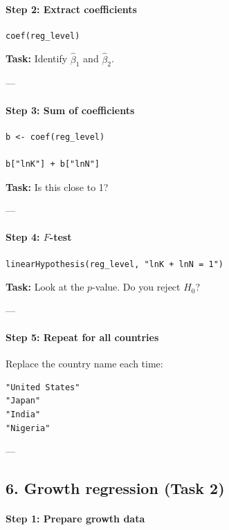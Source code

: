 \documentclass[12pt]{article}
\begin{document}
\paragraph{Step 2: Extract coefficients}

\begin{verbatim}
coef(reg_level)
\end{verbatim}

\textbf{Task:} Identify $\hat{\beta}_1$ and $\hat{\beta}_2$.

---

\paragraph{Step 3: Sum of coefficients}

\begin{verbatim}
b <- coef(reg_level)

b["lnK"] + b["lnN"]
\end{verbatim}

\textbf{Task:} Is this close to 1?

---

\paragraph{Step 4: $F$-test}

\begin{verbatim}
linearHypothesis(reg_level, "lnK + lnN = 1")
\end{verbatim}

\textbf{Task:} Look at the $p$-value. Do you reject $H_0$?

---

\paragraph{Step 5: Repeat for all countries}

Replace the country name each time:
\begin{verbatim}
"United States"
"Japan"
"India"
"Nigeria"
\end{verbatim}

---

\subsection*{6. Growth regression (Task 2)}

\paragraph{Step 1: Prepare growth data}
\end{document}
